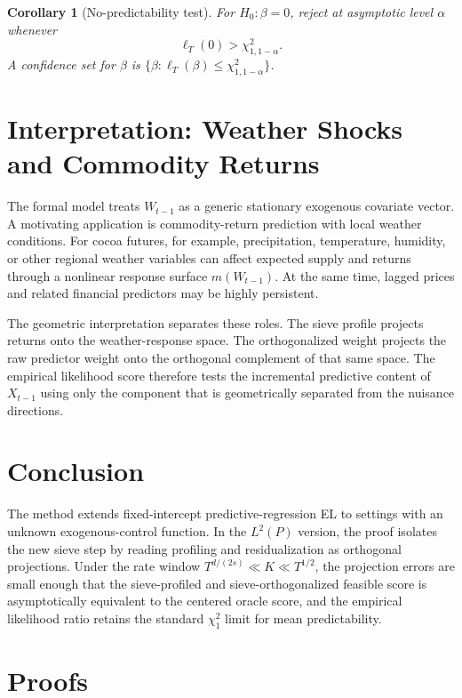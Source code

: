 ﻿\documentclass[11pt]{article}
\newtheorem{corollary}{Corollary}
\begin{document}
\begin{corollary}[No-predictability test]
For \(H_0:\beta=0\), reject at asymptotic level \(\alpha\) whenever
\[
    \ell_T(0)>\chi^2_{1,1-\alpha}.
\]
A confidence set for \(\beta\) is \(\{\beta:\ell_T(\beta)\leq\chi^2_{1,1-\alpha}\}\).
\end{corollary}

\section{Interpretation: Weather Shocks and Commodity Returns}

The formal model treats \(W_{t-1}\) as a generic stationary exogenous covariate vector. A motivating application is commodity-return prediction with local weather conditions. For cocoa futures, for example, precipitation, temperature, humidity, or other regional weather variables can affect expected supply and returns through a nonlinear response surface \(m(W_{t-1})\). At the same time, lagged prices and related financial predictors may be highly persistent.

The geometric interpretation separates these roles. The sieve profile projects returns onto the weather-response space. The orthogonalized weight projects the raw predictor weight onto the orthogonal complement of that same space. The empirical likelihood score therefore tests the incremental predictive content of \(X_{t-1}\) using only the component that is geometrically separated from the nuisance directions.

\section{Conclusion}

The method extends fixed-intercept predictive-regression EL to settings with an unknown exogenous-control function. In the \(L^2(P)\) version, the proof isolates the new sieve step by reading profiling and residualization as orthogonal projections. Under the rate window \(T^{d/(2s)}\ll K\ll T^{1/2}\), the projection errors are small enough that the sieve-profiled and sieve-orthogonalized feasible score is asymptotically equivalent to the centered oracle score, and the empirical likelihood ratio retains the standard \(\chi_1^2\) limit for mean predictability.

\appendix
\section{Proofs}
\label{app:geo-proofs}
\end{document}
